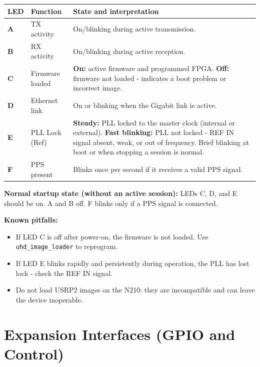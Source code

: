 \documentclass[11pt]{article}
\begin{document}
\begin{table}[h]
    \centering
    \begin{tabular}{p{}p{}p{}}
        \toprule
        \textbf{LED} & \textbf{Function} & \textbf{State and interpretation} \\
        \midrule
        \textbf{A} & TX activity & On/blinking during active transmission. \\
        \addlinespace
        \textbf{B} & RX activity & On/blinking during active reception. \\
        \addlinespace
        \textbf{C} & Firmware loaded & \textbf{On:} active firmware and programmed FPGA. \textbf{Off:} firmware not loaded - indicates a boot problem or incorrect image. \\
        \addlinespace
        \textbf{D} & Ethernet link & On or blinking when the Gigabit link is active. \\
        \addlinespace
        \textbf{E} & PLL Lock (Ref) & \textbf{Steady:} PLL locked to the master clock (internal or external). \textbf{Fast blinking:} PLL not locked - REF IN signal absent, weak, or out of frequency. Brief blinking at boot or when stopping a session is normal. \\
        \addlinespace
        \textbf{F} & PPS present & Blinks once per second if it receives a valid PPS signal. \\
        \bottomrule
    \end{tabular}
\end{table}

\textbf{Normal startup state (without an active session):} LEDs C, D, and E should be on. A and B off. F blinks only if a PPS signal is connected.

\textbf{Known pitfalls:}
\begin{itemize}
    \item If LED C is off after power-on, the firmware is not loaded. Use \texttt{uhd\_image\_loader} to reprogram.
    \item If LED E blinks rapidly and persistently during operation, the PLL has lost lock - check the REF IN signal.
    \item Do not load USRP2 images on the N210: they are incompatible and can leave the device inoperable.
\end{itemize}

\section{Expansion Interfaces (GPIO and Control)}
\end{document}
